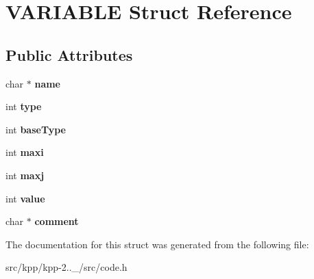 \hypertarget{structVARIABLE}{}\section{V\+A\+R\+I\+A\+B\+LE Struct Reference}
\label{structVARIABLE}
\subsection*{Public Attributes}
\begin{DoxyCompactItemize}
\item 
\mbox{\label{structVARIABLE_a0909b43ed3b361accbb8f829485ba6de}} 
char $\ast$ {\bfseries name}
\item 
\mbox{\label{structVARIABLE_a84814331e54156c3ac9fbe6d2b851daf}} 
int {\bfseries type}
\item 
\mbox{\label{structVARIABLE_a1e3b585a5d90e6fb6a4383a6e2f5732f}} 
int {\bfseries base\+Type}
\item 
\mbox{\label{structVARIABLE_ab12cb36b5cf0c9f7871684624c7c4464}} 
int {\bfseries maxi}
\item 
\mbox{\label{structVARIABLE_a8056c3c564b02f0ca2d6faa0bc3fe5a2}} 
int {\bfseries maxj}
\item 
\mbox{\label{structVARIABLE_a9c435f6139d7aa17e988f18fe010b710}} 
int {\bfseries value}
\item 
\mbox{\label{structVARIABLE_a42e3d576c7af8ac4d4098743fc757158}} 
char $\ast$ {\bfseries comment}
\end{DoxyCompactItemize}


The documentation for this struct was generated from the following file\+:\begin{DoxyCompactItemize}
\item 
src/kpp/kpp-\/2..\+\_/src/code.\+h\end{DoxyCompactItemize}
